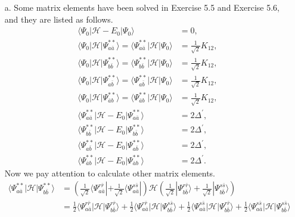 \documentclass[a4paper]{book}
\newcounter{solution}[chapter]
\begin{document}
	\begin{solution}
	
	\begin{itemize}
	
	\item[a.] Some matrix elements have been solved in Exercise 5.5 and Exercise 5.6, and they are listed as follows. 
	\begin{align*}
		\langle \Psi_0 | \mathscr{H} - E_0 | \Psi_0 \rangle &= 0 , \\
		\langle \Psi_0 | \mathscr{H} | \Psi^{**}_{a\bar{a}} \rangle = \langle \Psi^{**}_{a\bar{a}} | \mathscr{H} | \Psi_0 \rangle &= \frac{1}{ \sqrt{2} } K_{12} , \\
		\langle \Psi_0 | \mathscr{H} | \Psi^{**}_{b \bar{b}} \rangle = \langle \Psi^{**}_{b \bar{b}} | \mathscr{H} | \Psi_0 \rangle &= \frac{1}{ \sqrt{2} } K_{12} , \\
		\langle \Psi_0 | \mathscr{H} | \Psi^{**}_{a\bar{b}} \rangle = \langle \Psi^{**}_{a\bar{b}} | \mathscr{H} | \Psi_0 \rangle &= \frac{1}{ \sqrt{2} } K_{12} , \\
		\langle \Psi_0 | \mathscr{H} | \Psi^{**}_{\bar{a}b}\rangle = \langle \Psi^{**}_{\bar{a}b} | \mathscr{H} | \Psi_0 \rangle &= \frac{1}{ \sqrt{2} } K_{12} , \\
		\langle \Psi^{**}_{a\bar{a}} | \mathscr{H} - E_0 | \Psi^{**}_{a\bar{a}} \rangle &= 2 \Delta^\prime , \\
		\langle \Psi^{**}_{b\bar{b}} | \mathscr{H} - E_0 | \Psi^{**}_{b\bar{b}} \rangle &= 2 \Delta^\prime , \\
		\langle \Psi^{**}_{a\bar{b}} | \mathscr{H} - E_0 | \Psi^{**}_{a\bar{b}} \rangle &= 2 \Delta^\prime , \\
		\langle \Psi^{**}_{\bar{a}b} | \mathscr{H} - E_0 | \Psi^{**}_{\bar{a}b} \rangle &= 2 \Delta^\prime .
	\end{align*}
	Now we pay attention to calculate other matrix elements.
	\begin{align*}
		\langle \Psi^{**}_{a\bar{a}} | \mathscr{H} | \Psi^{**}_{b\bar{b}} \rangle &= \left( \frac{1}{ \sqrt{2} } \langle \Psi^{ r \bar{r} }_{a \bar{a}} | + \frac{1}{ \sqrt{2} } \langle \Psi^{ s \bar{s} }_{a \bar{a}} | \right) \mathscr{H} \left( \frac{1}{ \sqrt{2} } | \Psi^{ r \bar{r} }_{b \bar{b}} \rangle + \frac{1}{ \sqrt{2} } | \Psi^{ s \bar{s} }_{b \bar{b}} \rangle \right) \\
		&= \frac{1}{2} \langle \Psi^{ r \bar{r} }_{a \bar{a}} | \mathscr{H} | \Psi^{ r \bar{r} }_{b \bar{b}} \rangle + \frac{1}{2} \langle \Psi^{ r \bar{r} }_{a \bar{a}} | \mathscr{H} | \Psi^{ s \bar{s} }_{b \bar{b}} \rangle + \frac{1}{2} \langle \Psi^{ s \bar{s} }_{a \bar{a}} | \mathscr{H} | \Psi^{ r \bar{r} }_{b \bar{b}} \rangle +  \frac{1}{2} \langle \Psi^{ s \bar{s} }_{a \bar{a}} | \mathscr{H} | \Psi^{ s \bar{s} }_{b \bar{b}} \rangle \\

\end{align*}
\end{itemize}
\end{solution}
\end{document}
